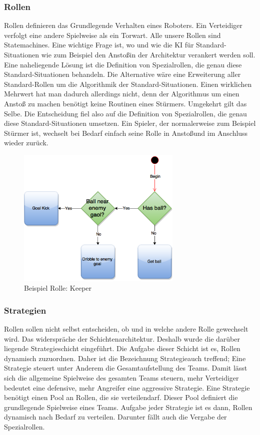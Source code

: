 \documentclass[fontsize=12pt,a4paper,draft]{scrartcl}[2003/01/01]
\begin{document}
\subsubsection{Rollen}
Rollen definieren das Grundlegende Verhalten eines Roboters. Ein Verteidiger verfolgt eine andere Spielweise als ein Torwart. Alle unsere Rollen sind Statemachines. Eine wichtige Frage ist, wo und wie die KI für Standard-Situationen wie zum Beispiel den \glqq Anstoß\grqq in der Architektur verankert werden soll. Eine naheliegende Lösung ist die Definition von Spezialrollen, die genau diese Standard-Situationen behandeln. Die Alternative wäre eine Erweiterung aller Standard-Rollen um die Algorithmik der Standard-Situationen. Einen wirklichen Mehrwert hat man dadurch allerdings nicht, denn der Algorithmus um einen Anstoß zu machen benötigt keine Routinen eines Stürmers. Umgekehrt gilt das Selbe. Die Entscheidung fiel also auf die Definition von Spezialrollen, die genau diese Standard-Situationen umsetzen. Ein Spieler, der normalerweise zum Beispiel Stürmer ist, wechselt bei Bedarf einfach seine Rolle in \glqq Anstoß\grqq und im Anschluss wieder zurück.

\begin{figure}[H]
	\centering
	\includegraphics[width=0.7\textwidth]{Grafiken/KI/simple_Player}
	\caption[Beispiel Rolle: Keeper]{Beispiel Rolle: Keeper}
\end{figure}


\subsubsection{Strategien}
Rollen sollen nicht selbst entscheiden, ob und in welche andere Rolle gewechselt wird. Das widerspräche der Schichtenarchitektur. Deshalb wurde die darüber liegende Strategieschicht eingeführt. Die Aufgabe dieser Schicht ist es, Rollen dynamisch zuzuordnen. Daher ist die Bezeichnung \glqq Strategie\grqq auch treffend; Eine Strategie steuert unter Anderem die Gesamtaufstellung des Teams. Damit lässt sich die allgemeine Spielweise des gesamten Teams steuern, mehr Verteidiger bedeutet eine defensive, mehr Angreifer eine aggressive Strategie. Eine Strategie benötigt einen Pool an Rollen, die sie \glqq verteilen\grqq darf. Dieser Pool definiert die grundlegende Spielweise eines Teams. Aufgabe jeder Strategie ist es dann, Rollen dynamisch nach Bedarf zu verteilen. Darunter fällt auch die Vergabe der Spezialrollen.
\end{document}
